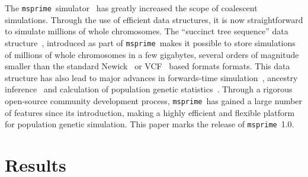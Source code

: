 \documentclass{article}
\newcommand{\msprime}[0]{\texttt{msprime}}
\begin{document}
The \msprime\ simulator~\citep{kelleher2016efficient,kelleher2020coalescent}
has greatly increased the scope of coalescent simulations.
Through the use of efficient data structures, it is
now straightforward to simulate millions of whole chromosomes.
The ``succinct tree sequence'' data
structure~\citep{kelleher2016efficient,kelleher2018efficient,kelleher2019inferring,
wohns2021unified},
introduced as part of \msprime\, makes it possible to store simulations
of millions of whole chromosomes in a few gigabytes, several orders
of magnitude smaller than the standard
Newick~\citep{felsenstein1989phylip} or
VCF~\citep{danecek2011variant} based formats formats.
This data structure has
also lead to major advances in forwards-time
simulation~\citep{kelleher2018efficient,haller2018tree},
ancestry inference~\citep{kelleher2019inferring,wohns2021unified}
and calculation of population genetic statistics~\citep{ralph2019efficiently}.
Through a rigorous open-source community development process,
\msprime\ has gained a large number of features since its introduction,
making a highly efficient and flexible platform for population
genetic simulation.
This paper marks the release of \msprime\ 1.0.

%

\section*{Results}
\end{document}
